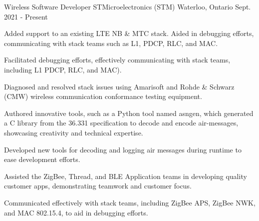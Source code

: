 
\begin{cventries}

  \cventry
    {Wireless Software Developer} %
    {STMicroelectronics (STM)} %
    {Waterloo, Ontario} %
    {Sept. 2021 - Present} %
    {
      \begin{cvitems} %
        \item {Added support to an existing LTE NB \& MTC stack. Aided in debugging efforts, communicating with stack teams such as L1, PDCP, RLC, and MAC.}
        \item {Facilitated debugging efforts, effectively communicating with stack teams, including L1 PDCP, RLC, and MAC).}
        \item {Diagnosed and resolved stack issues using Amarisoft and Rohde \& Schwarz (CMW) wireless communication conformance testing equipment.}
        \item {Authored innovative tools, such as a Python tool named asngen, which generated a C library from the 36.331 specification to decode and encode air-messages, showcasing creativity and technical expertise.}
        \item {Developed new tools for decoding and logging air messages during runtime to ease development efforts.}
        \item {Assisted the ZigBee, Thread, and BLE Application teams in developing quality customer apps, demonstrating teamwork and customer focus.}
        \item {Communicated effectively with stack teams, including ZigBee APS, ZigBee NWK, and MAC 802.15.4, to aid in debugging efforts.}
      \end{cvitems}
    }


\end{cventries}
